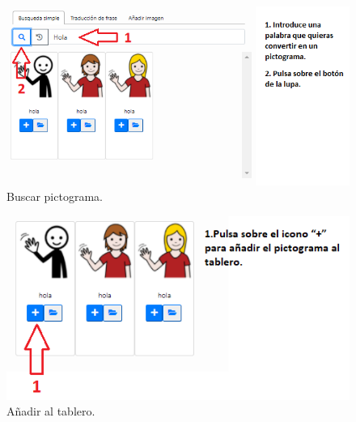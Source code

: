 \begin{figure}[h!]
	\centering
	\includegraphics[width=\linewidth]{Imagenes/Bitmap/Tarea1-Pista1}
	\caption{Buscar pictograma.}
	\label{fig:tarea1-pista1}
\end{figure}

\begin{figure}[h!]
	\centering
	\includegraphics[width=\linewidth]{Imagenes/Bitmap/Tarea1-Pista2}
	\caption{Añadir al tablero.}
	\label{fig:tarea1-pista2}
\end{figure}

